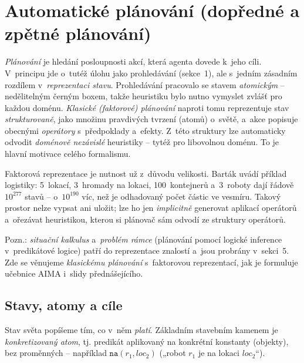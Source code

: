 \section{Automatické plánování (dopředné a zpětné plánování)}

\emph{Plánování} je hledání posloupnosti akcí, která agenta dovede k~jeho cíli. V~principu jde o~tutéž úlohu jako prohledávání (sekce~1), ale s~jedním zásadním rozdílem v~\emph{reprezentaci stavu}. Prohledávání pracovalo se stavem \emph{atomickým} -- nedělitelným černým boxem, takže heuristiku bylo nutno vymyslet zvlášť pro každou doménu. \emph{Klasické (faktorové) plánování} naproti tomu reprezentuje stav \emph{strukturovaně}, jako množinu pravdivých tvrzení (atomů) o~světě, a~akce popisuje obecnými \emph{operátory} s~předpoklady a~efekty. Z~této struktury lze automaticky odvodit \emph{doménově nezávislé} heuristiky -- tytéž pro libovolnou doménu. To je hlavní motivace celého formalismu.

\begin{intuice}
Faktorová reprezentace je nutnost už z~důvodu velikosti. Barták uvádí příklad logistiky: 5~lokací, 3~hromady na lokaci, 100~kontejnerů a~3~roboty dají řádově $10^{277}$ stavů -- o~$10^{190}$ víc, než je odhadovaný počet částic ve vesmíru. Takový prostor nelze vypsat ani uložit; lze ho jen \emph{implicitně} generovat aplikací operátorů a~ořezávat heuristikou, kterou si plánovač sám odvodí ze struktury operátorů.
\end{intuice}

Pozn.: \emph{situační kalkulus} a~\emph{problém rámce} (plánování pomocí logické inference v~predikátové logice) patří do reprezentace znalostí a~jsou probrány v~sekci~5. Zde se věnujeme \emph{klasickému plánování} s~faktorovou reprezentací, jak je formuluje učebnice AIMA i~slidy přednášejícího.

\subsection{Stavy, atomy a cíle}

Stav světa popíšeme tím, co v~něm \emph{platí}. Základním stavebním kamenem je \emph{konkretizovaný atom}, tj. predikát aplikovaný na konkrétní konstanty (objekty), bez proměnných -- například $\mathtt{na}(\mathit{r}_1,\mathit{loc}_2)$ („robot $r_1$ je na lokaci $\mathit{loc}_2$``).

